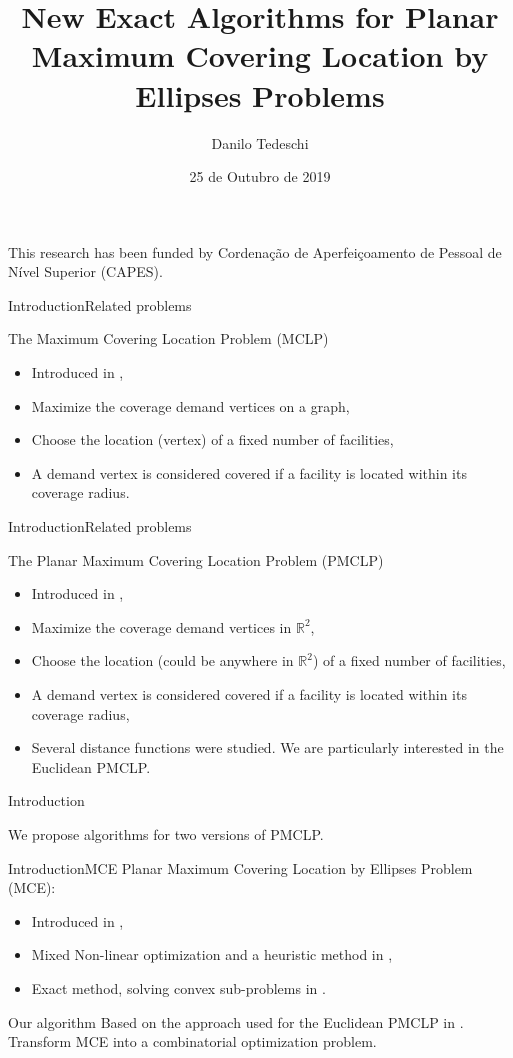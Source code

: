 \documentclass{beamer}
\author{Danilo Tedeschi}
\title{New Exact Algorithms for Planar Maximum Covering Location by Ellipses Problems}
\institute{Universidade de São Paulo}
\date{25 de Outubro de 2019}
\newcommand{\R}{\mathbb{R}}
\newcommand{\sigla}[2]{#2 (#1)}
\theoremstyle{definition}
\begin{document}
	
	\begin{frame}[t,plain]
		\titlepage
		
		\footnotesize This research has been funded by Cordenação de Aperfeiçoamento de Pessoal de Nível Superior (CAPES).
	\end{frame}

	\begin{frame}{Introduction}{Related problems}

		\sigla{MCLP}{The Maximum Covering Location Problem} 
		\begin{itemize}
			\item Introduced in \cite{church:1974},
			\item Maximize the coverage demand vertices on a graph,
			\item Choose the location (vertex) of a fixed number of facilities,
			\item A demand vertex is considered covered if a facility is located within its coverage radius.
		\end{itemize}
	\end{frame}

	\begin{frame}{Introduction}{Related problems}
	
	\sigla{PMCLP}{The Planar Maximum Covering Location Problem} 
	\begin{itemize}
		\item Introduced in \cite{church:1984},
		\item Maximize the coverage demand vertices in $\R^2$,
		\item Choose the location (could be anywhere in $\R^2$) of a fixed number of facilities,
		\item A demand vertex is considered covered if a facility is located within its coverage radius,
		\item Several distance functions were studied. We are particularly interested in the Euclidean PMCLP.
	\end{itemize}
	\end{frame}

\begin{frame}{Introduction}
	
	We propose algorithms for two versions of PMCLP.
	
\end{frame}

\begin{frame}{Introduction}{MCE}
	Planar Maximum Covering Location by Ellipses Problem (MCE):
	\begin{itemize}
		\item Introduced in \cite{canbolat}, 
		\item Mixed Non-linear optimization and a heuristic method in \cite{canbolat},
		\item Exact method, solving convex sub-problems in \cite{andreta}.
	\end{itemize}

	\begin{block}{Our algorithm}		
		Based on the approach used for the Euclidean PMCLP in \cite{church:1984}.
		Transform MCE into a combinatorial optimization problem.
	\end{block}
\end{frame}
\end{document}

